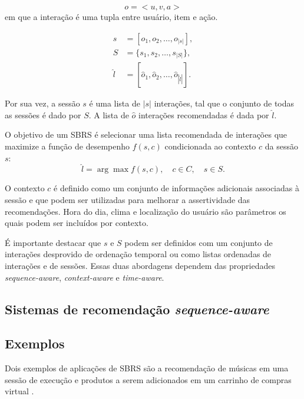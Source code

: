   \begin{equation}
    o = <u, v, a>
    \end{equation}
  em que a interação é uma tupla entre usuário, item e ação.

  \begin{equation*}
  \begin{aligned}
  s & = [o_1, o_2, \ldots, o_{|s|}], \\
  S & = \{s_1, s_2, \ldots, s_{|S|}\}, \\
  \hat{l} & = [\hat{o}_1, \hat{o}_2, \ldots, \hat{o}_{|\hat{l}|}].
  \end{aligned}
  \end{equation*}
  
    Por sua vez, a sessão $s$ é uma lista de $|s|$ interações, tal que o
  conjunto de todas as sessões é dado por $S$. A lista de $\hat{o}$ interações
  recomendadas é dada por $\hat{l}$.

  O objetivo de um SBRS é selecionar uma lista recomendada de interações
  que maximize a função de desempenho $f(s, c)$ condicionada ao contexto $c$ da
  sessão $s$:
  \[\hat{l} = \arg \max f(s, c), \quad c \in C, \quad s \in S.\]   

 O contexto $c$ é definido como um conjunto de informações adicionais associadas
  à sessão e que podem ser utilizadas para melhorar a assertividade das
  recomendações.  Hora do dia, clima e localização do usuário são parâmetros os
  quais podem ser incluídos por contexto.

  É importante destacar que $s$ e $S$ podem
  ser definidos com um conjunto de interações desprovido de ordenação temporal
  ou como listas ordenadas de interações e de sessões. Essas duas abordagens
  dependem das propriedades \textit{sequence-aware}, \textit{context-aware}
  e \textit{time-aware}.

  \subsection{Sistemas de recomendação \textit{sequence-aware}}

  \subsection{Exemplos}

  Dois exemplos de aplicações de SBRS
  são a recomendação de músicas em uma sessão de execução \cite{music_2013} e
  produtos a serem adicionados em um carrinho de compras virtual
  \cite{shopping_cart_2023}.



